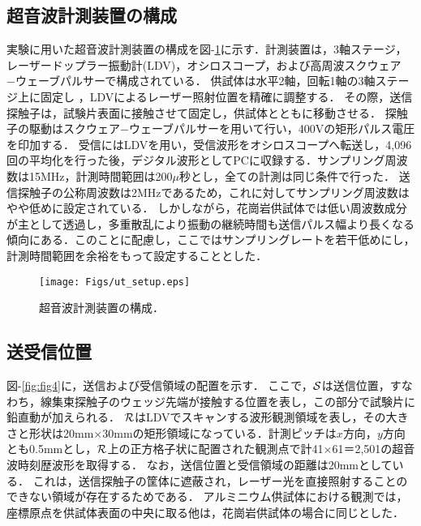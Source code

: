 \subsection{超音波計測装置の構成}
実験に用いた超音波計測装置の構成を図-\ref{fig:fig3}に示す．計測装置は，3軸ステージ，レーザードップラー振動計(LDV)，オシロスコープ，および高周波スクウェア−ウェーブパルサーで構成されている．
供試体は水平2軸，回転1軸の3軸ステージ上に固定し ，LDVによるレーザー照射位置を精確に調整する．
その際，送信探触子は，試験片表面に接触させて固定し，供試体とともに移動させる．
探触子の駆動はスクウェア−ウェーブパルサーを用いて行い，400Vの矩形パルス電圧を印加する．
受信にはLDVを用い，受信波形をオシロスコープへ転送し，4,096回の平均化を行った後，デジタル波形としてPCに収録する．サンプリング周波数は15MHz，計測時間範囲は200$\mu$秒とし，全ての計測は同じ条件で行った．
送信探触子の公称周波数は2MHzであるため，これに対してサンプリング周波数はやや低めに設定されている．
しかしながら，花崗岩供試体では低い周波数成分が主として透過し，多重散乱により振動の継続時間も送信パルス幅より長くなる傾向にある．このことに配慮し，ここではサンプリングレートを若干低めにし，計測時間範囲を余裕をもって設定することとした．
\begin{figure}[t]
\begin{center}
\texttt{[image: Figs/ut\_setup.eps]}
\caption{
	超音波計測装置の構成．
}
\label{fig:fig3}
\end{center}
\end{figure}
\subsection{送受信位置}
図-\ref{fig:fig4}に，送信および受信領域の配置を示す．
ここで，${\cal S}$は送信位置，すなわち，線集束探触子のウェッジ先端が接触する位置を表し，この部分で試験片に鉛直動が加えられる．
${\cal R}$はLDVでスキャンする波形観測領域を表し，その大きさと形状は20mm$\times$30mmの矩形領域になっている．計測ピッチは$x$方向，$y$方向とも0.5mmとし，$\cal R$上の正方格子状に配置された観測点で計41×61＝2,501の超音波時刻歴波形を取得する．
なお，送信位置と受信領域の距離は20mmとしている．
これは，送信探触子の筐体に遮蔽され，レーザー光を直接照射することのできない領域が存在するためである．
アルミニウム供試体における観測では，座標原点を供試体表面の中央に取る他は，花崗岩供試体の場合に同じとした．

